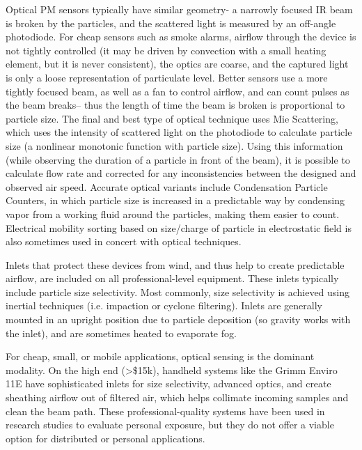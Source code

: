 Optical PM sensors typically have similar geometry- a narrowly focused IR beam is broken by the particles, and the scattered light is measured by an off-angle photodiode.  For cheap sensors such as smoke alarms, airflow through the device is not tightly controlled (it may be driven by convection with a small heating element, but it is never consistent), the optics are coarse, and the captured light is only a loose representation of particulate level.  Better sensors use a more tightly focused beam, as well as a fan to control airflow, and can count pulses as the beam breaks-- thus the length of time the beam is broken is proportional to particle size.  The final and best type of optical technique uses Mie Scattering, which uses the intensity of scattered light on the photodiode to calculate particle size (a nonlinear monotonic function with particle size). \cite{morpurgo2012} Using this information (while observing the duration of a particle in front of the beam), it is possible to calculate flow rate and corrected for any inconsistencies between the designed and observed air speed.   Accurate optical variants include Condensation Particle Counters, in which particle size is increased in a predictable way by condensing vapor from a working fluid around the particles, making them easier to count. Electrical mobility sorting based on size/charge of particle in electrostatic field is also sometimes used in concert with optical techniques.


Inlets that protect these devices from wind, and thus help to create predictable airflow, are included on all professional-level equipment.  These inlets typically include particle size selectivity.  Most commonly, size selectivity is achieved using inertial techniques (i.e. impaction or cyclone filtering).  Inlets are generally mounted in an upright position due to particle deposition (so gravity works with the inlet), and are sometimes heated to evaporate fog.

For cheap, small, or mobile applications, optical sensing is the dominant modality.  On the high end (>\$15k), handheld systems like the Grimm Enviro 11E have sophisticated inlets for size selectivity, advanced optics, and create sheathing airflow out of filtered air, which helps collimate incoming samples and clean the beam path.  These professional-quality systems have been used in research studies to evaluate personal exposure, but they do not offer a viable option for distributed or personal applications.  

